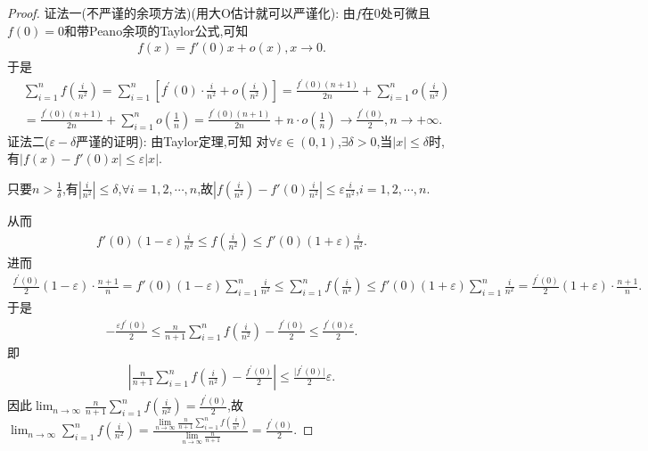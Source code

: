 \documentclass[../../main.tex]{subfiles}%
\begin{document}
\begin{proof}

{\color{blue}证法一(不严谨的余项方法)(用大O估计就可以严谨化):}
由\(f\)在\(0\)处可微且$f(0)=0$和带Peano余项的Taylor公式,可知
\begin{align*}
f(x)=f'(0)x+o(x),x\to0.
\end{align*}
于是
\begin{align*}
&\sum\limits_{i = 1}^{n} f\left(\frac{i}{n^2}\right) = \sum\limits_{i = 1}^{n} \left[f^{\prime}(0) \cdot \frac{i}{n^2} + o\left(\frac{i}{n^2}\right)\right]
= \frac{f^{\prime}(0)(n + 1)}{2n} + \sum\limits_{i = 1}^{n} o\left(\frac{i}{n^2}\right)\\
&= \frac{f^{\prime}(0)(n + 1)}{2n} + \sum\limits_{i = 1}^{n} o\left(\frac{1}{n}\right)
= \frac{f^{\prime}(0)(n + 1)}{2n} + n\cdot o\left(\frac{1}{n}\right) \to \frac{f^{\prime}(0)}{2},n\to+\infty.
\end{align*}
{\color{blue}证法二($\varepsilon-\delta$严谨的证明):}
由Taylor定理,可知
对\(\forall \varepsilon \in (0,1)\),\(\exists \delta > 0\),当\(\vert x \vert \leqslant  \delta\)时,有\(\vert f(x) - f'(0)x \vert \leqslant  \varepsilon \vert x \vert\).

只要\(n > \frac{1}{\delta}\),有\(\left\vert \frac{i}{n^2} \right\vert \leqslant  \delta\),\(\forall i = 1,2,\cdots,n\),故\(\left\vert f\left(\frac{i}{n^2}\right) - f'(0)\frac{i}{n^2} \right\vert \leqslant  \varepsilon \frac{i}{n^2}\),\(i = 1,2,\cdots,n\).

从而\begin{align*}
f'(0)(1 - \varepsilon) \frac{i}{n^2} \leqslant  f\left(\frac{i}{n^2}\right) \leqslant  f'(0)(1 + \varepsilon) \frac{i}{n^2}.
\end{align*}
进而
\begin{align*}
\frac{f^{\prime}(0)}{2} (1 - \varepsilon) \cdot \frac{n + 1}{n}=f'(0)(1 - \varepsilon) \sum\limits_{i = 1}^{n} \frac{i}{n^2} \leqslant  \sum\limits_{i = 1}^{n} f\left(\frac{i}{n^2}\right) \leqslant  f'(0)(1 + \varepsilon) \sum\limits_{i = 1}^{n} \frac{i}{n^2}=\frac{f^{\prime}(0)}{2} (1 + \varepsilon) \cdot \frac{n + 1}{n}.
\end{align*}
于是
\begin{align*}
-\frac{\varepsilon f^{\prime}(0)}{2} \leqslant  \frac{n}{n + 1} \sum\limits_{i = 1}^{n} f\left(\frac{i}{n^2}\right) - \frac{f^{\prime}(0)}{2} \leqslant  \frac{f^{\prime}(0)\varepsilon}{2} .
\end{align*}
即\begin{align*}
\left\vert \frac{n}{n + 1} \sum\limits_{i = 1}^{n} f\left(\frac{i}{n^2}\right) - \frac{f^{\prime}(0)}{2} \right\vert \leqslant  \frac{\vert f^{\prime}(0) \vert}{2} \varepsilon.
\end{align*}
因此$\lim_{n\rightarrow \infty} \frac{n}{n+1}\sum\limits_{i=1}^n{f\left( \frac{i}{n^2} \right)}=\frac{f^{\prime}(0)}{2}
$,故\(\lim_{n\rightarrow \infty} \sum\limits_{i=1}^n{f\left( \frac{i}{n^2} \right)}=\frac{\lim\limits_{n\rightarrow \infty} \frac{n}{n+1}\sum\limits_{i=1}^n{f\left( \frac{i}{n^2} \right)}}{\lim\limits_{n\rightarrow \infty} \frac{n}{n+1}}=\frac{f^{\prime}(0)}{2}\).

\end{proof}
\end{document}
